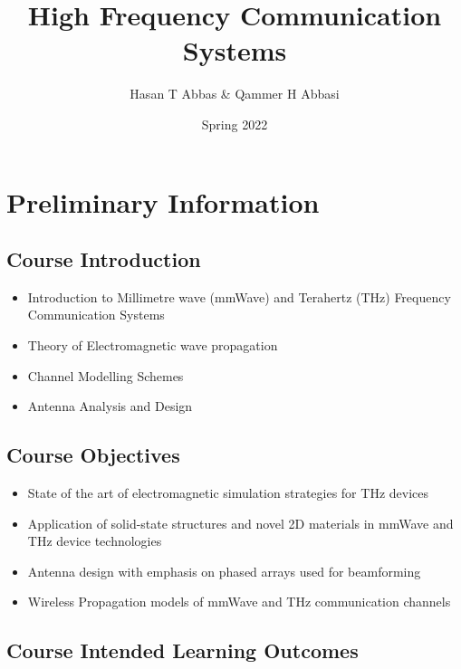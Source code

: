 \documentclass[
]{article}
\title{High Frequency Communication Systems}
\author{Hasan T Abbas \& Qammer H Abbasi}
\date{Spring 2022}
\providecommand{\tightlist}{%
  \setlength{\itemsep}{0pt}\setlength{\parskip}{0pt}}
\begin{document}
\maketitle

\hypertarget{preliminary-information}{%
\section{Preliminary Information}\label{preliminary-information}}

\hypertarget{course-introduction}{%
\subsection{Course Introduction}\label{course-introduction}}

\begin{itemize}
\tightlist
\item
  Introduction to Millimetre wave (mmWave) and Terahertz (THz) Frequency
  Communication Systems
\item
  Theory of Electromagnetic wave propagation
\item
  Channel Modelling Schemes
\item
  Antenna Analysis and Design
\end{itemize}

\hypertarget{course-objectives}{%
\subsection{Course Objectives}\label{course-objectives}}

\begin{itemize}
\tightlist
\item
  State of the art of electromagnetic simulation strategies for THz
  devices
\item
  Application of solid-state structures and novel 2D materials in mmWave
  and THz device technologies
\item
  Antenna design with emphasis on phased arrays used for beamforming
\item
  Wireless Propagation models of mmWave and THz communication channels
\end{itemize}

\hypertarget{course-intended-learning-outcomes}{%
\subsection{Course Intended Learning
Outcomes}\label{course-intended-learning-outcomes}}
\end{document}
